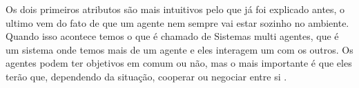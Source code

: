 Os dois primeiros atributos são mais intuitivos pelo que já foi explicado antes, o ultimo vem do fato de que um agente nem sempre vai estar sozinho no ambiente. Quando isso acontece temos o que é chamado de Sistemas multi agentes, que é um sistema onde temos mais de um agente e eles interagem um com os outros. Os agentes podem ter objetivos em comum ou não, mas o mais importante é que eles terão que, dependendo da situação, cooperar ou negociar entre si \cite{intelligence2003modern}.    
